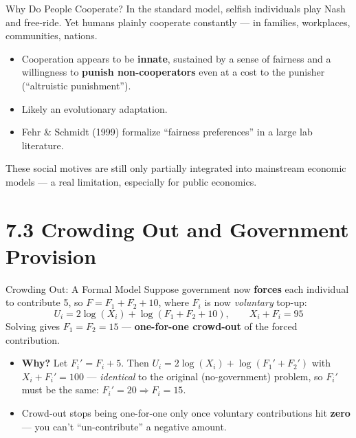 \documentclass[11pt,aspectratio=169]{beamer}
\begin{document}
\begin{frame}{Why Do People Cooperate?}
  In the standard model, selfish individuals play Nash and free-ride. Yet humans plainly cooperate constantly --- in families, workplaces, communities, nations.
  \begin{itemize}
    \item Cooperation appears to be \textbf{innate}, sustained by a sense of fairness and a willingness to \textbf{punish non-cooperators} even at a cost to the punisher (``altruistic punishment'').
    \item Likely an evolutionary adaptation.
    \item Fehr \& Schmidt (1999) formalize ``fairness preferences'' in a large lab literature.
  \end{itemize}
  \vspace{0.4em}
  \small These social motives are still only partially integrated into mainstream economic models --- a real limitation, especially for public economics.
\end{frame}

\section{7.3 Crowding Out and Government Provision}

\begin{frame}{Crowding Out: A Formal Model}
  Suppose government now \textbf{forces} each individual to contribute 5, so $F = F_1+F_2+10$, where $F_i$ is now \emph{voluntary} top-up:
  \[ U_i = 2\log(X_i) + \log(F_1+F_2+10), \qquad X_i+F_i = 95 \]
  Solving gives $F_1=F_2=15$ --- \textbf{one-for-one crowd-out} of the forced contribution.
  \begin{itemize}
    \item \textbf{Why?} Let $F_i' = F_i+5$. Then $U_i=2\log(X_i)+\log(F_1'+F_2')$ with $X_i+F_i'=100$ --- \emph{identical} to the original (no-government) problem, so $F_i'$ must be the same: $F_i'=20 \Rightarrow F_i=15$.
    \item Crowd-out stops being one-for-one only once voluntary contributions hit \textbf{zero} --- you can't ``un-contribute'' a negative amount.
  \end{itemize}
\end{frame}
\end{document}
